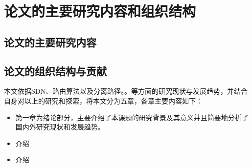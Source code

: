 \section{论文的主要研究内容和组织结构}
\subsection{论文的主要研究内容}
\subsection{论文的组织结构与贡献}
本文依据SDN、路由算法以及分离路径。。等方面的研究现状与发展趋势，并结合自身对以上的研究和探索，将本文分为五章，各章主要内容如下：
\begin{itemize}
  \item 第一章为绪论部分，主要介绍了本课题的研究背景及其意义并且简要地分析了国内外研究现状和发展趋势。
  \item 介绍
  \item 介绍
\end{itemize}


